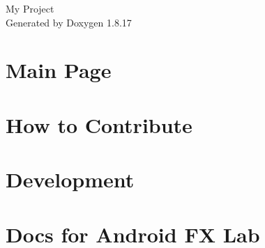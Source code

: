 \let\mypdfximage\pdfximage\def\pdfximage{\immediate\mypdfximage}\documentclass[twoside]{book}
\newcommand{\+}{\discretionary{\mbox{\scriptsize$\hookleftarrow$}}{}{}}
\newcommand{\clearemptydoublepage}{%
  \newpage{\pagestyle{empty}\cleardoublepage}%
}
\begin{document}
\hypersetup{pageanchor=false,
             bookmarksnumbered=true,
             pdfencoding=unicode
            }
\begin{titlepage}
\vspace*{7cm}
\begin{center}%
{\Large My Project }\\
\vspace*{1cm}
{\large Generated by Doxygen 1.8.17}\\
\end{center}
\end{titlepage}
\clearemptydoublepage
{}
\tableofcontents
\clearemptydoublepage
{}
\hypersetup{pageanchor=true}

\chapter{Main Page}
\label{index}\hypertarget{index}{}
\chapter{How to Contribute}
\label{md__c_1__users_fab_src__github_branches__neural_amp_modeler_plugin_i_plug2__dependencies__build_e16d2d4bdd15b35495eb78424b00d4d2}

\chapter{Development}
\label{md__c_1__users_fab_src__github_branches__neural_amp_modeler_plugin_i_plug2__dependencies__build_3f890b68976137156a227c240fc6fe3f}

\chapter{Docs for Android FX Lab}
\label{md__c_1__users_fab_src__github_branches__neural_amp_modeler_plugin_i_plug2__dependencies__build_34c39a5932d994f0fdbd802aa832f310}

\end{document}
